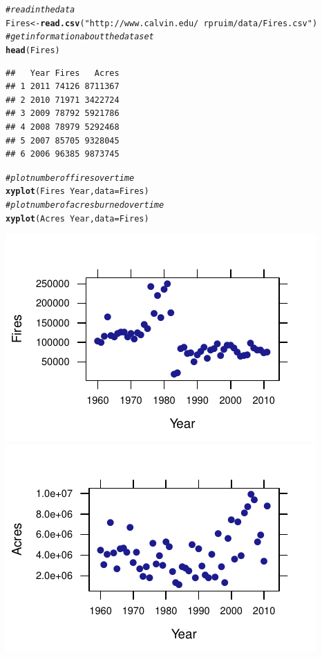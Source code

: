 \documentclass[twoside]{book}\usepackage[]{graphicx}\usepackage[]{xcolor}
\makeatletter
\def\maxwidth{ %
  \ifdim\Gin@nat@width>\linewidth
    \linewidth
  \else
    \Gin@nat@width
  \fi
}
\newcommand{\hlstr}[1]{\textcolor[rgb]{0.192,0.494,0.8}{#1}}%
\newcommand{\hlcom}[1]{\textcolor[rgb]{0.678,0.584,0.686}{\textit{#1}}}%
\newcommand{\hlopt}[1]{\textcolor[rgb]{0,0,0}{#1}}%
\newcommand{\hlstd}[1]{\textcolor[rgb]{0.345,0.345,0.345}{#1}}%
\newcommand{\hlkwb}[1]{\textcolor[rgb]{0.69,0.353,0.396}{#1}}%
\newcommand{\hlkwc}[1]{\textcolor[rgb]{0.333,0.667,0.333}{#1}}%
\newcommand{\hlkwd}[1]{\textcolor[rgb]{0.737,0.353,0.396}{\textbf{#1}}}%
\newenvironment{kframe}{%
 \def\at@end@of@kframe{}%
 \ifinner\ifhmode%
  \def\at@end@of@kframe{\end{minipage}}%
  \begin{minipage}{\columnwidth}%
 \fi\fi%
 \def\FrameCommand##1{\hskip\@totalleftmargin \hskip-\fboxsep
 \colorbox{shadecolor}{##1}\hskip-\fboxsep
     \hskip-\linewidth \hskip-\@totalleftmargin \hskip\columnwidth}%
 \MakeFramed {\advance\hsize-\width
   \@totalleftmargin\z@ \linewidth\hsize
   \@setminipage}}%
 {\par\unskip\endMakeFramed%
 \at@end@of@kframe}
\newenvironment{knitrout}{}{} %
\makeatother
\begin{document}
\begin{solution}

\begin{knitrout}
\color{fgcolor}\begin{kframe}
\begin{alltt}
\hlcom{#read in the data}
\hlstd{Fires} \hlkwb{<-} \hlkwd{read.csv}\hlstd{(}\hlstr{"http://www.calvin.edu/~rpruim/data/Fires.csv"}\hlstd{)}
\hlcom{#get information about the dataset}
\hlkwd{head}\hlstd{(Fires)}
\end{alltt}
\begin{verbatim}
##   Year Fires   Acres
## 1 2011 74126 8711367
## 2 2010 71971 3422724
## 3 2009 78792 5921786
## 4 2008 78979 5292468
## 5 2007 85705 9328045
## 6 2006 96385 9873745
\end{verbatim}
\begin{alltt}
\hlcom{#plot number of fires over time}
\hlkwd{xyplot}\hlstd{(Fires} \hlopt{~} \hlstd{Year,} \hlkwc{data}\hlstd{=Fires)}
\hlcom{#plot number of acres burned over time}
\hlkwd{xyplot}\hlstd{(Acres} \hlopt{~} \hlstd{Year,} \hlkwc{data}\hlstd{=Fires)}
\end{alltt}
\end{kframe}

{\centering \includegraphics[width=\maxwidth]{figures/fig-unnamed-chunk-30-1} 
\includegraphics[width=\maxwidth]{figures/fig-unnamed-chunk-30-2} 

}
\end{knitrout}
\end{solution}
\end{document}
